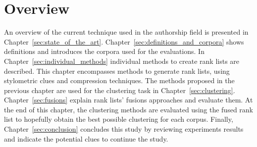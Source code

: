 \section{Overview}

An overview of the current technique used in the authorship field is presented in Chapter~\ref{sec:state_of_the_art}.
Chapter~\ref{sec:definitions_and_corpora} shows definitions and introduces the corpora used for the evaluations.
In Chapter~\ref{sec:individual_methods} individual methods to create rank lists are described.
This chapter encompasses methods to generate rank lists, using stylometric clues and compression techniques.
The methods proposed in the previous chapter are used for the clustering task in Chapter~\ref{sec:clustering}.
Chapter~\ref{sec:fusions} explain rank lists' fusions approaches and evaluate them.
At the end of this chapter, the clustering methods are evaluated using the fused rank list to hopefully obtain the best possible clustering for each corpus.
Finally, Chapter~\ref{sec:conclusion} concludes this study by reviewing experiments results and indicate the potential clues to continue the study.
